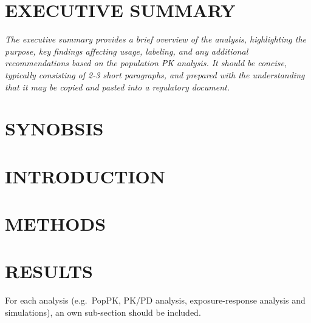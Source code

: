 \documentclass[
  letterpaper,
  toc=chapterentrywithdots,
  11pt,
  headings=small]{scrreprt}
\begin{document}
\hypertarget{section}{%
\chapter{}\label{section}}


\hypertarget{sec-executive-summary}{%
\chapter{EXECUTIVE SUMMARY}\label{sec-executive-summary}}

\textit{{The executive summary provides a brief overview of the analysis, highlighting the purpose, key findings affecting usage, labeling, and any additional recommendations based on the population PK analysis. It should be concise, typically consisting of 2-3 short paragraphs, and prepared with the understanding that it may be copied and pasted into a regulatory document.}}


\hypertarget{sec-synobsis}{%
\chapter*{SYNOBSIS}\label{sec-synobsis}}



\hypertarget{sec-introduction}{%
\chapter{INTRODUCTION}\label{sec-introduction}}


\hypertarget{sec-methods}{%
\chapter{METHODS}\label{sec-methods}}


\hypertarget{sec-results}{%
\chapter{RESULTS}\label{sec-results}}

For each analysis (e.g.~PopPK, PK/PD analysis, exposure-response
analysis and simulations), an own sub-section should be included.
\end{document}
